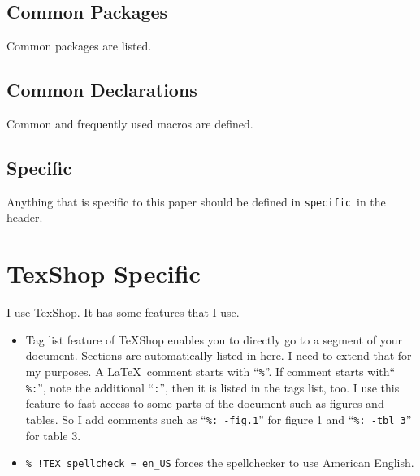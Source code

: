 \documentclass[pre,twocolumn,showkeys,longbibliography]{revtex4-1}
\newcommand{\hCode}[1]{\texttt{#1}}
\theoremstyle{plain}
\theoremstyle{definition}
\theoremstyle{remark}
\newcommand{\hbSSpecific}{\hCode{specific}}
\begin{document}
\subsection{Common Packages}

Common packages are listed.




\subsection{Common Declarations}

Common and frequently used macros are defined.




\subsection{Specific}

Anything that is specific to this paper should be defined in \hbSSpecific\ in the header.




\section{TexShop Specific}

I use TexShop.
It has some features that I use.
\begin{itemize}

	\item
	Tag list feature of TeXShop enables you to directly go to a segment of your document.
	Sections are automatically listed in here.
	I need to extend that for my purposes.
	A \LaTeX\  comment starts with ``\hCode{\%}''.
	If comment starts with`` \hCode{\%:}'',
	note the additional ``\hCode{:}'',
	then it is listed in the tags list, too.
	I use this feature to fast access to some parts of the document such as figures and tables.
	So I add comments such as 
	``\hCode{\%: -fig.1}'' for figure 1 and
	``\hCode{\%: -tbl 3}'' for table 3.
	
	\item 
	\hCode{\% !TEX spellcheck = en\_US} forces the spellchecker to use American English.
	
\end{itemize}










\listofchanges   %
\end{document}

